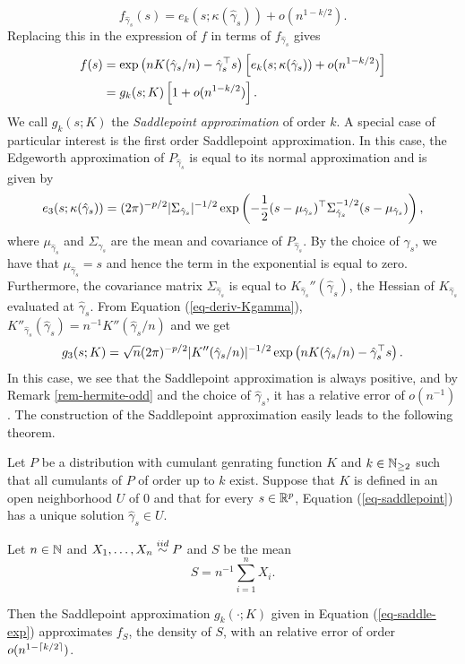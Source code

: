 \begin{equation*}
    f_{\hat\gamma_s}(s) = e_k(s; \kappa(\hat\gamma_s)) + o(n^{1-k/2}).
\end{equation*}
Replacing this in the expression of $f$ in terms of $f_{\hat\gamma_s}$ gives
\begin{align}
    f(s) &= \exp\left(nK(\hat\gamma_s / n) - \hat\gamma_s^\top s\right)\left[e_k(s; \kappa(\hat\gamma_s)) + o(n^{1-k/2})\right]\nonumber\\
    &= g_k(s; K)\left[1 + o(n^{1-k/2})\right]. \label{eq-saddle-exp}
\end{align}
We call $g_k(s; K)$ the \textit{Saddlepoint approximation} of order $k$. A special case of particular interest is the first order Saddlepoint approximation. In this case, the Edgeworth approximation of $P_{\hat\gamma_s}$ is equal to its normal approximation and is given by
\begin{equation*}
    e_3(s; \kappa(\hat\gamma_s)) = (2\pi)^{-p/2}|\Sigma_{\hat\gamma_s}|^{-1/2}\exp\left(-\frac{1}{2}(s - \mu_{\hat\gamma_s})^\top \Sigma_{\hat\gamma_s}^{-1/2}(s - \mu_{\hat\gamma_s}) \right),
\end{equation*}
where $\mu_{\hat\gamma_s}$ and $\Sigma_{\hat\gamma_s}$ are the mean and covariance of $P_{\hat\gamma_s}$. By the choice of $\hat\gamma_s$, we have that $\mu_{\hat\gamma_s} = s$ and hence the term in the exponential is equal to zero. Furthermore, the covariance matrix $\Sigma_{\hat\gamma_s}$ is equal to $K_{\hat\gamma_s}''(\hat\gamma_s)$, the Hessian of $K_{\hat\gamma_s}$ evaluated at $\hat\gamma_s$. From Equation (\ref{eq-deriv-Kgamma}), $K''_{\hat\gamma_s}(\hat\gamma_s) = n^{-1} K''(\hat\gamma_s/n)$ and we get 
\begin{equation} \label{eq-saddle-3}
    g_3(s; K) = \sqrt{n} (2\pi)^{-p/2}|K''(\hat\gamma_s/n)|^{-1/2} \exp\left(nK(\hat\gamma_s / n) - \hat\gamma_s^\top s\right).
\end{equation}
In this case, we see that the Saddlepoint approximation is always positive, and by Remark \ref{rem-hermite-odd} and the choice of $\hat\gamma_s$, it has a relative error of $o(n^{-1})$. The construction of the Saddlepoint approximation easily leads to the following theorem.

\begin{theorem}
    Let $P$ be a distribution with cumulant genrating function $K$ and $k \in \mathbb{N}_{\geq 2}$ such that all cumulants of $P$ of order up to $k$ exist. Suppose that $K$ is defined in an open neighborhood $U$ of 0 and that for every $s \in {\mathbb{R}^p}$, Equation (\ref{eq-saddlepoint}) has a unique solution $\hat\gamma_s \in U$. 

    Let $n \in \mathbb{N}$ and $X_1, \ldots, X_n \stackrel{iid}{\sim} P$ and $S$ be the mean
    \begin{equation*}
        S = n^{-1} \sum_{i=1}^n X_i.
    \end{equation*}

    Then the Saddlepoint approximation $g_k(\cdot; K)$ given in Equation (\ref{eq-saddle-exp}) approximates $f_S$, the density of $S$, with an relative error of order $o(n^{1-\lceil k/2\rceil})$.
\end{theorem}

